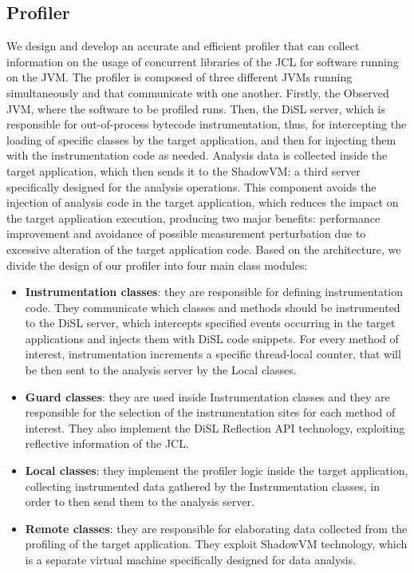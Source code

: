 \documentclass[]{usiinfthesis}
\begin{document}
\subsection{Profiler}
We design and develop an accurate and efficient profiler that can collect information on the usage of concurrent libraries of the JCL for software running on the JVM. The profiler  is composed of three different JVMs running simultaneously and that communicate with one another. Firstly, the Observed JVM, where the software to be profiled runs. Then, the DiSL server, which is responsible for out-of-process bytecode instrumentation, thus, for intercepting the loading of specific classes by the target application, and then for injecting them with the instrumentation code as needed. Analysis data is collected inside the target application, which then sends it to the ShadowVM: a third server specifically designed for the analysis operations. This component avoids the injection of analysis code in the target application, which reduces the impact on the target application execution, producing two major benefits: performance improvement and avoidance of possible measurement perturbation due to excessive alteration of the target application code. Based on the architecture, we divide the design of our profiler into four main class modules:
\begin{itemize}
\item \textbf{Instrumentation classes}: they are responsible for defining  instrumentation code. They communicate which classes and methods should be instrumented to the DiSL server, which intercepts specified events occurring in the target applications and injects them with DiSL code snippets. For every method of interest, instrumentation increments a specific thread-local counter, that will be then sent to the analysis server by the Local classes.
\item \textbf{Guard classes}: they are used inside Instrumentation classes and they are responsible for the selection of the instrumentation sites for each method of interest. They also implement the DiSL Reflection API technology, exploiting reflective information of the JCL.
\item \textbf{Local classes}: they implement the profiler logic inside the target application, collecting instrumented data gathered by the Instrumentation classes, in order to then send them to the analysis server.
\item \textbf{Remote classes}: they are responsible for elaborating data collected from the profiling of the target application. They exploit ShadowVM technology, which is a separate virtual machine specifically designed for data analysis.
\end{itemize}
\end{document}
